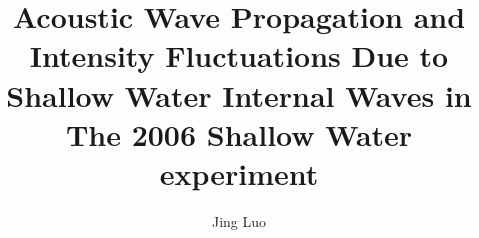 %
%
\title{Acoustic Wave Propagation and Intensity Fluctuations Due to Shallow Water Internal Waves in The 2006 Shallow Water experiment}
\author{Jing Luo}
 
\majorfieldtrue{} 

\maketitlepage
\clearpage\mbox{}\clearpage


\begin{front}


\tablespagefalse  %
\maketocloflot

\clearpage\mbox{}\clearpage
\end{front}
